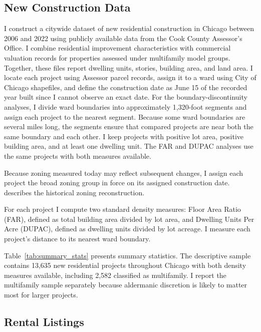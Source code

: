 \subsection{New Construction Data}
\label{subsec:new_construction_data}

I construct a citywide dataset of new residential construction in Chicago between 2006 and 2022 using publicly available data from the Cook County Assessor's Office.
I combine residential improvement characteristics with commercial valuation records for properties assessed under multifamily model groups.
Together, these files report dwelling units, stories, building area, and land area.
I locate each project using Assessor parcel records, assign it to a ward using City of Chicago shapefiles, and define the construction date as June 15 of the recorded year built since I cannot observe an exact date.
For the boundary-discontinuity analyses, I divide ward boundaries into approximately 1,320-foot segments and assign each project to the nearest segment.
Because some ward boundaries are several miles long, the segments ensure that compared projects are near both the same boundary and each other.
I keep projects with positive lot area, positive building area, and at least one dwelling unit.
The FAR and DUPAC analyses use the same projects with both measures available.

Because zoning measured today may reflect subsequent changes, I assign each project the broad zoning group in force on its assigned construction date.
 describes the historical zoning reconstruction.

For each project I compute two standard density measures: Floor Area Ratio (FAR), defined as total building area divided by lot area, and Dwelling Units Per Acre (DUPAC), defined as dwelling units divided by lot acreage.
I measure each project's distance to its nearest ward boundary.

Table~\ref{tab:summary_stats} presents summary statistics.
The descriptive sample contains 13,635 new residential projects throughout Chicago with both density measures available, including 2,582 classified as multifamily.
I report the multifamily sample separately because aldermanic discretion is likely to matter most for larger projects.



\subsection{Rental Listings}
\label{subsec:rental_listings}

